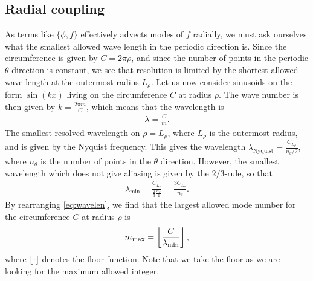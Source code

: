 \subsection{Radial coupling}
%
As terms like $\{\phi, f\}$ effectively advects modes of $f$ radially, we must ask ourselves what the smallest allowed wave length in the periodic direction is.
Since the circumference is given by $C=2\pi\rho$, and since the number of points in the periodic $\theta$-direction is constant, we see that resolution is limited by the shortest allowed wave length at the outermost radius $L_\rho$.
Let us now consider sinusoids on the form $\sin(kx)$ living on the circumference $C$ at radius $\rho$.
The wave number is then given by $k=\frac{2\pi m}{C}$, which means that the wavelength is
%
\begin{align}
    \lambda = \frac{C}{m}.
    \label{eq:wavelen}
\end{align}
%
The smallest resolved wavelength on $\rho=L_\rho$, where $L_\rho$ is the outermost radius, and is given by the Nyquist frequency.
This gives the wavelength $\lambda_{\text{Nyquist}} = \frac{C_{L_\rho}}{n_\theta/2}$, where $n_\theta$ is the number of points in the $\theta$ direction.
However, the smallest wavelength which does not give aliasing is given by the $2/3$-rule, so that
%
\begin{align*}
    \lambda_\min = \frac{C_{L_\rho}}{\frac{2}{3}\frac{n_\theta}{2}} = \frac{3C_{L_\rho}}{n_\theta}.
\end{align*}
%
By rearranging \cref{eq:wavelen}, we find that the largest allowed mode number for the circumference $C$ at radius $\rho$ is
%
\begin{align*}
    m_{\text{max}} = \left\lfloor \frac{C}{\lambda_{\text{min}}}\right\rfloor,
\end{align*}
%
where $\lfloor \cdot \rfloor$ denotes the floor function.
Note that we take the floor as we are looking for the maximum allowed integer.

